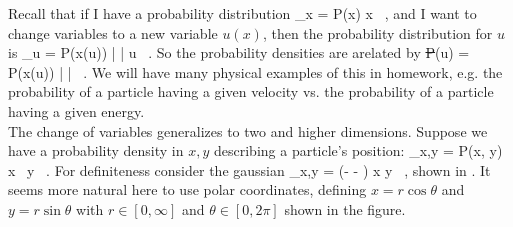 \documentclass[12pt]{article}
\begin{document}

%

%

%


%


Recall that  if I have a probability distribution 
\st
 \dd \Pscr_x = P(x) \dd x \, , 
\stp
and I want to change variables to a new variable $u(x)$,  then the 
probability distribution for $u$  is
\st
 \dd \Pscr_u = P(x(u)) \left|  \right| \dd u  \, .
\stp
So the probability densities are arelated  by
\st
  P(u) = P(x(u)) \left|  \right| \, . 
\stp
We will have  many physical  examples of this in  homework, e.g. the probability of a particle having a given velocity vs. the probability of a particle having a given energy.\\


The change of variables generalizes to two and higher dimensions. Suppose 
we have a probability density in $x,y$  describing 
a particle's position:
\st
 \dd \Pscr_{x,y} = P(x, y) \,  \dd x \, \dd y \, .
\stp
For definiteness consider  the gaussian
\st
\label{eq:pxy}
 \dd \Pscr_{x,y} =  \exp\left(-  -  \right) \dd x \dd y \, ,
\stp
shown in . It seems more natural here to use polar coordinates,
defining $x = r \cos\theta$ and $y = r\sin\theta$  with $r \in [0, \infty]$ 
and $\theta \in [0, 2\pi]$ shown in the figure. \\
\end{document}
